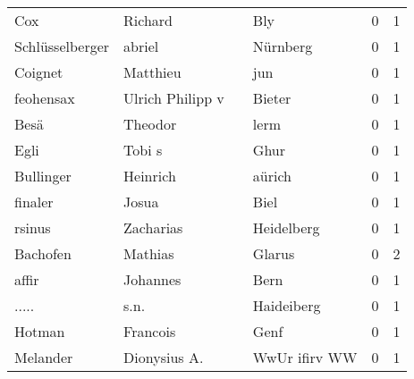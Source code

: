 \begin{tabular}{llllrr}
                      Cox &                            Richard &             &                                         Bly &          0 &         1 \\
          Schlüsselberger &                             abriel &             &                                    Nürnberg &          0 &         1 \\
                  Coignet &                           Matthieu &             &                                         jun &          0 &         1 \\
                feohensax &                   Ulrich Philipp v &             &                                      Bieter &          0 &         1 \\
                     Besä &                            Theodor &             &                                        lerm &          0 &         1 \\
                     Egli &                             Tobi s &             &                                        Ghur &          0 &         1 \\
                Bullinger &                           Heinrich &             &                                      aürich &          0 &         1 \\
                  finaler &                              Josua &             &                                        Biel &          0 &         1 \\
                   rsinus &                          Zacharias &             &                                  Heidelberg &          0 &         1 \\
                 Bachofen &                            Mathias &             &                                      Glarus &          0 &         2 \\
                    affir &                           Johannes &             &                                        Bern &          0 &         1 \\
                    ..... &                               s.n. &             &                                  Haideiberg &          0 &         1 \\
                   Hotman &                           Francois &             &                                        Genf &          0 &         1 \\
                 Melander &                       Dionysius A. &             &                               WwUr ifirv WW &          0 &         1 \\

\end{tabular}
